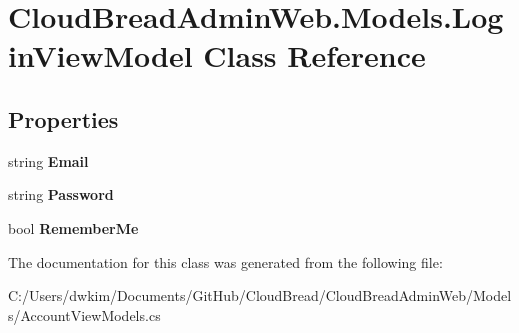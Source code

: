 \hypertarget{a00131}{}\section{Cloud\+Bread\+Admin\+Web.\+Models.\+Login\+View\+Model Class Reference}
\label{a00131}
\subsection*{Properties}
\begin{DoxyCompactItemize}
\item 
string {\bfseries Email}\hypertarget{a00131_a9e3d87fdc3cac69d57579b44b1799a2b}{}\label{a00131_a9e3d87fdc3cac69d57579b44b1799a2b}

\item 
string {\bfseries Password}\hypertarget{a00131_aa2b8e9a7f680dec9ac624f89f2208913}{}\label{a00131_aa2b8e9a7f680dec9ac624f89f2208913}

\item 
bool {\bfseries Remember\+Me}\hypertarget{a00131_aa142135ee422191302a762c6341e2286}{}\label{a00131_aa142135ee422191302a762c6341e2286}

\end{DoxyCompactItemize}


The documentation for this class was generated from the following file\+:\begin{DoxyCompactItemize}
\item 
C\+:/\+Users/dwkim/\+Documents/\+Git\+Hub/\+Cloud\+Bread/\+Cloud\+Bread\+Admin\+Web/\+Models/Account\+View\+Models.\+cs\end{DoxyCompactItemize}
